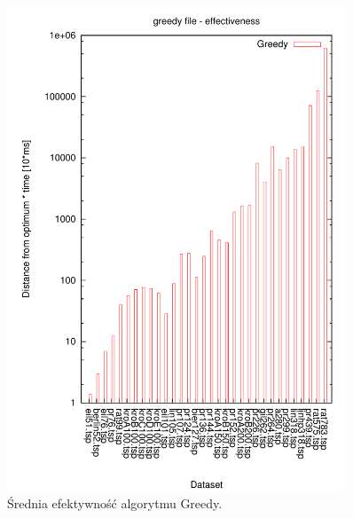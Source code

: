 \begin{figure}
\begin{center}
\includegraphics[width=0.9\textwidth]{wykresy/greedy_ef}
\end{center}
\caption{Średnia efektywność algorytmu Greedy.}
\label{greedy_ef}
\end{figure}


